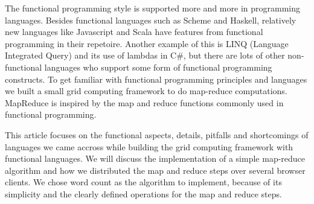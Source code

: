 The functional programming style is supported more and more in programming
languages. Besides functional languages such as Scheme and Haskell, relatively
new languages like Javascript and Scala have features from functional
programming in their repetoire. Another example of this is LINQ (Language
Integrated Query) and its use of lambdas in C\#, but there are lots of other
non-functional languages who support some form of functional programming
constructs. To get familiar with functional programming principles and languages
we built a small grid computing framework to do map-reduce computations.
MapReduce is inspired by the map and reduce functions commonly used in
functional programming.

This article focuses on the functional aspects, details, pitfalls and
shortcomings of languages we came accross while building the grid computing
framework with functional languages. We will discuss the implementation of a
simple map-reduce algorithm and how we distributed the map and reduce steps over
several browser clients. We chose word count as the algorithm to implement,
because of its simplicity and the clearly defined operations for the map and
reduce steps.
